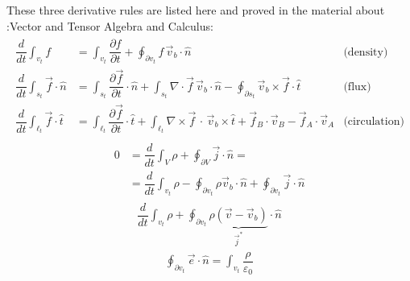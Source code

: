 \documentclass[letterpaper,10pt,english]{jupyterBook}
\begin{document}
\sphinxAtStartPar
These three derivative rules are listed here and proved in the material about :Vector and Tensor Algebra and Calculus:
\begin{equation*}
\begin{split}\begin{aligned}
  \dfrac{d}{dt} \int_{v_t} f & = \int_{v_t} \dfrac{\partial f}{\partial t} + \oint_{\partial v_t} f \, \vec{v}_b \cdot \hat{n} & \text{(density)} \\
  \dfrac{d}{dt} \int_{s_t} \vec{f} \cdot \hat{n} & = \int_{s_t} \dfrac{\partial \vec{f}}{\partial t} \cdot \hat{n} + \int_{s_t} \nabla \cdot \vec{f} \, \vec{v}_b \cdot \hat{n} - \oint_{\partial s_t} \vec{v}_b \times \vec{f} \cdot \hat{t} & \text{(flux)} \\
  \dfrac{d}{dt} \int_{\ell_t} \vec{f} \cdot \hat{t} & = \int_{\ell_t} \dfrac{\partial \vec{f}}{\partial t} \cdot \hat{t} + \int_{\ell_t} \nabla \times \vec{f} \, \cdot \, \vec{v}_b \times \hat{t} + \vec{f}_B \cdot \vec{v}_B - \vec{f}_A \cdot \vec{v}_A & \text{(circulation)}
\end{aligned}\end{split}
\end{equation*}
\sphinxAtStartPar
{}
\begin{equation*}
\begin{split}\begin{aligned}
   0 & = \dfrac{d}{dt} \int_{V} \rho + \oint_{\partial V} \vec{j} \cdot \hat{n} = \\
   & = \dfrac{d}{dt} \int_{v_t} \rho - \oint_{\partial v_t } \rho \vec{v}_b \cdot \hat{n} + \oint_{\partial v_t} \vec{j} \cdot \hat{n} 
\end{aligned}\end{split}
\end{equation*}\begin{equation*}
\begin{split}
    \dfrac{d}{dt} \int_{v_t} \rho + \oint_{\partial v_t} \underbrace{\rho (\vec{v} - \vec{v}_b)}_{\vec{j}^*} \cdot \hat{n} 
\end{split}
\end{equation*}
\sphinxAtStartPar
{}
\begin{equation*}
\begin{split}
    \oint_{\partial v_t} \vec{e} \cdot \hat{n} = \int_{v_t} \dfrac{\rho}{\varepsilon_0}
\end{split}
\end{equation*}
\end{document}
